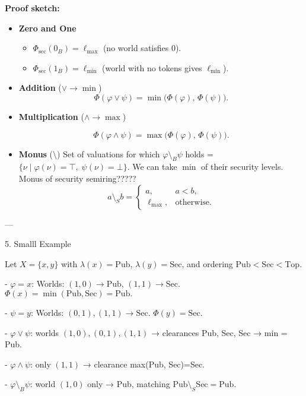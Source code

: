 \textbf{Proof sketch:}
\begin{itemize}
    \item \textbf{Zero and One}  
        \begin{itemize}
            \item \(\Phi_{\mathrm{sec}}(0_B)=\ell_{\max}\) (no world satisfies 0).
            \item \(\Phi_{\mathrm{sec}}(1_B)=\ell_{\min}\) (world with no tokens gives \(\ell_{\min}\)).
        \end{itemize}
    \item \textbf{Addition} (\(\vee \to \min\))  
        \[
            \Phi(\varphi\vee\psi)
            = \min\bigl(\Phi(\varphi),\,\Phi(\psi)\bigr).
        \]
    \item \textbf{Multiplication} (\(\wedge \to \max\))  
        
        \[
            \Phi(\varphi\wedge\psi)
            = \max\bigl(\Phi(\varphi),\,\Phi(\psi)\bigr).
        \]
    \item \textbf{Monus} (\(\setminus\))  
        Set of valuations for which  \(\varphi\setminus_B\psi\) holds =  
        \(\{\nu \mid \varphi(\nu)=\top,\;\psi(\nu)=\bot\}\).  
        We can take \(\min\) of their security levels.
        Monus of security semiring?????
        \[
            a\setminus_S b =
            \begin{cases}
                a, & a<b,\\
                \ell_{\max}, &\text{otherwise}.
            \end{cases}
        \]
\end{itemize}

---

 5. Smalll Example

Let \(X=\{x,y\}\) with \(\lambda(x)=\mathrm{Pub}\), \(\lambda(y)=\mathrm{Sec}\),
and ordering \(\mathrm{Pub}<\mathrm{Sec}<\mathrm{Top}\).

- \(\varphi = x\):  
  Worlds: \((1,0)\to\mathrm{Pub}\), \((1,1)\to\mathrm{Sec}\).  
  \(\Phi(x)=\min(\mathrm{Pub},\mathrm{Sec})=\mathrm{Pub}.\)

- \(\psi = y\):  
  Worlds: \((0,1),(1,1)\to\mathrm{Sec}\).  
  \(\Phi(y)=\mathrm{Sec}.\)

- \(\varphi\vee\psi\): worlds \((1,0),(0,1),(1,1)\) → clearances Pub, Sec, Sec → min = Pub.

- \(\varphi\wedge\psi\): only \((1,1)\) → clearance max(Pub, Sec)=Sec.

- \(\varphi\setminus_B\psi\): world \((1,0)\) only → Pub, matching \(\mathrm{Pub}\setminus_S\mathrm{Sec}=\mathrm{Pub}.\)


